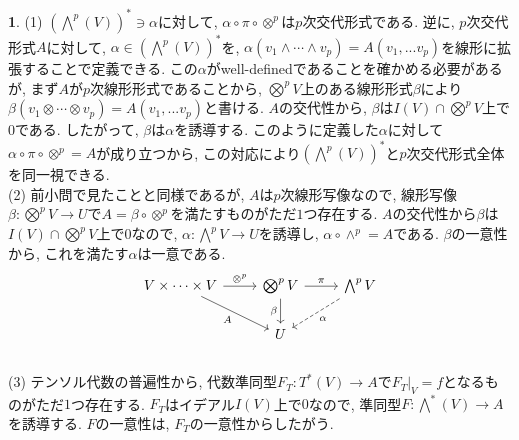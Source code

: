 \documentclass[dvipdfmx]{amsart}
\theoremstyle{definition}
\newtheorem{ans}{}
\numberwithin{ans}{section}
\begin{document}
\begin{ans}
  (1) $(\bigwedge^p(V))^\ast \ni \alpha$に対して,
  $\alpha \circ \pi \circ \otimes^p$は$p$次交代形式である.
  逆に, $p$次交代形式$A$に対して, $\alpha \in (\bigwedge^p(V))^\ast$を,
  $\alpha(v_1 \wedge \cdots \wedge v_p) = A(v_1,... v_p)$を線形に拡張することで定義できる.
  この$\alpha$がwell-definedであることを確かめる必要があるが,
  まず$A$が$p$次線形形式であることから, $\bigotimes^pV$上のある線形形式$\beta$により
  $\beta(v_1 \otimes \cdots \otimes v_p) = A(v_1,... v_p)$と書ける.
  $A$の交代性から, $\beta$は$I(V) \cap \bigotimes^pV$上で$0$である. したがって, $\beta$は$\alpha$を誘導する.
  このように定義した$\alpha$に対して$\alpha \circ \pi \circ \otimes^p = A$が成り立つから,
  この対応により$(\bigwedge^p(V))^\ast$と$p$次交代形式全体を同一視できる.\\
  (2) 前小問で見たことと同様であるが, $A$は$p$次線形写像なので,
  線形写像$\beta: \bigotimes^pV \rightarrow U$で$A = \beta \circ \otimes^p$を満たすものがただ$1$つ存在する.
  $A$の交代性から$\beta$は$I(V) \cap \bigotimes^pV$上で$0$なので,
  $\alpha: \bigwedge^pV \rightarrow U$を誘導し, $\alpha \circ \wedge^p = A$である.
  $\beta$の一意性から, これを満たす$\alpha$は一意である.
  \[
    \begin{tikzcd}
      V \times \cdots \times V \ar[r, "\otimes^p"] \ar[rd, "A"'] &\bigotimes^pV \ar[d, "\beta"'] \ar[r, "\pi"] & \bigwedge^pV \ar[ld, dashed, "\alpha"]\\
      & U &
    \end{tikzcd}
  \]
  \\
  (3) テンソル代数の普遍性から, 代数準同型$F_T: T^\ast(V) \rightarrow A$で$F_T|_V = f$となるものがただ$1$つ存在する.
  $F_T$はイデアル$I(V)$上で$0$なので, 準同型$F: \bigwedge^\ast(V) \rightarrow A$を誘導する.
  $F$の一意性は, $F_T$の一意性からしたがう.
\end{ans}
\end{document}
